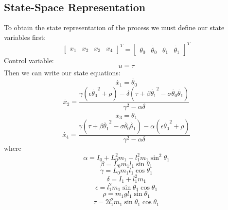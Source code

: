 \subsection{State-Space Representation}
To obtain the state representation of the process we must define our state variables first:
\begin{equation}
	\begin{bmatrix}
	x_1 & x_2 & x_3 & x_4
	\end{bmatrix}^T = 
	\begin{bmatrix}
	\theta_0 & \dot{\theta_0} & \theta_1 & \dot{\theta_1}
	\end{bmatrix}^T
\end{equation}
Control variable:
\begin{equation} u = \tau \end{equation}
Then we can write our state equations:
\begin{equation}\dot{x_1} = \dot{\theta_0} \end{equation}
\begin{equation}\dot{x_2} = \frac{\gamma(\epsilon\dot{\theta_0}^2+\rho)-\delta(\tau+\beta\dot{\theta_1}^2-\sigma\dot{\theta_0}\dot{\theta_1})}{\gamma^2-\alpha\delta}\end{equation}
\begin{equation}\dot{x_3} = \dot{\theta_1}\end{equation}
\begin{equation}\dot{x_4} = \frac{\gamma(\tau+\beta\dot{\theta_1}^2-\sigma\dot{\theta_0}\dot{\theta_1})-\alpha(\epsilon\dot{\theta_0}^2+\rho)}{\gamma^2-\alpha\delta}\end{equation}
where
\begin{equation}\alpha = I_0+L_0^2m_1+l_1^2m_1\sin^2\theta_1\end{equation}
\begin{equation}\beta = L_0m_1l_1\sin\theta_1 \end{equation}
\begin{equation}\gamma = L_0m_1l_1\cos\theta_1\end{equation}
\begin{equation}\delta = I_1+l_1^2m_1\end{equation}
\begin{equation}\epsilon = l^2_1m_1\sin\theta_1\cos\theta_1\end{equation}
\begin{equation}\rho = m_1gl_1\sin\theta_1\end{equation}
\begin{equation}\tau = 2l^2_1m_1\sin\theta_1\cos\theta_1\end{equation}

